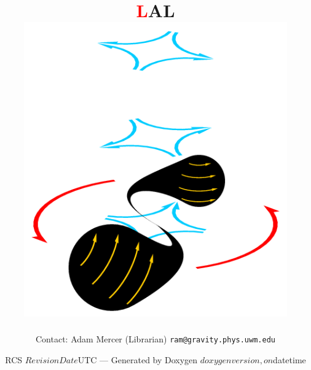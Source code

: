\documentclass{article}
\def\rcs#1{\def\next##1#1{\mbox{##1}}\next}
\begin{document}



\title{
\sffamily\bfseries\Huge
\textcolor{red}{\lsdfont L}AL
\hspace{-2em}
\\[\bigskipamount]
\includegraphics[height=5in]{merger}
}
\author{Contact: Adam Mercer (Librarian) \texttt{ram@gravity.phys.uwm.edu}}
\date{RCS \rcs$Revision$\rcs$Date$UTC ---
Generated by Doxygen $doxygenversion, on $datetime}

\maketitle

\newpage
\nopagebreak
\tableofcontents

\clearemptydoublepage
{}
\end{document}
